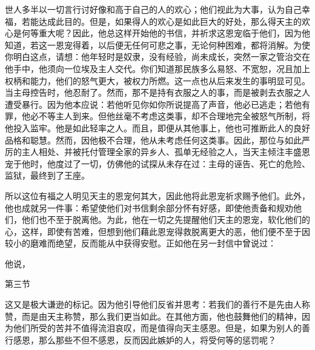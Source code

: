 世人多半以一切言行讨好像和高于自己的人的欢心；他们视此为大事，认为自己幸福，若能达成此目的。但是，如果得人的欢心是如此巨大的好处，那么得天主的欢心是何等重大呢？因此，他总这样开始他的书信，并祈求这恩宠临于他们，因为他知道，若这一恩宠得着，以后便无任何可悲之事，无论何种困难，都将消解。为使你明白这点，请想：他年轻时是奴隶，没有经验，尚未成长，突然一家之管治交在他手中，他须向一位埃及主人交代。你们知道那民族多么易怒、不宽恕，况且加上权柄和能力，他们的怒气更大，被权力所燃。这一点也从后来发生的事明显可见。当主母控告时，他忍耐了。然而，那不是持有衣服之人的事，而是被剥去衣服之人遭受暴行。因为他本应说：若他听见你如你所说提高了声音，他必已逃走；若他有罪，他必不等主人到来。但他丝毫不考虑这类事，却不合理地完全被怒气所制，将他投入监牢。他是如此轻率之人。而且，即便从其他事上，他也可推断此人的良好品格和聪慧。然而，因他极不合理，他从未考虑任何这类事。因此，那位与如此严厉的主人相处、并被托付管理全家的异乡人、孤单无经验之人，当天主倾注丰盛恩宠于他时，他度过了一切，仿佛他的试探从未存在过：主母的诬告、死亡的危险、监狱，最终到了王座。\par

所以这位有福之人明见天主的恩宠何其大，因此他将此恩宠祈求赐予他们。此外，他也成就另一件事：希望使他们对书信剩余部分怀有好感，即使他责备和规劝他们，他们也不至于脱离他。为此，他在一切之先提醒他们天主的恩宠，软化他们的心，这样，即使有苦难，但想到他们藉此恩宠得救脱离更大的恶，他们便不至于因较小的磨难而绝望，反而能从中获得安慰。正如他在另一封信中曾说过： \par

他说，\par

第三节  \par

这又是极大谦逊的标记。因为他引导他们反省并思考：若我们的善行不是先由人称赞，而是由天主称赞，那么我们更当如此。在其他方面，他也鼓舞他们的精神，因为他们所受的苦并不值得流泪哀叹，而是值得向天主感恩。但是，如果为别人的善行感恩，那么那些不但不感恩，反而因此嫉妒的人，将受何等的惩罚呢？\par

\par

\par

